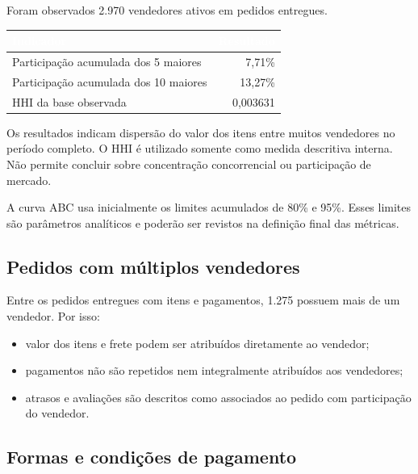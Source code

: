 \documentclass[12pt,a4paper]{article}
\newcounter{none}
\newcommand{\CabecalhoTabela}[1]{\textcolor{white}{\textbf{#1}}}
\providecommand{\tightlist}{
  \setlength{\itemsep}{0pt}\setlength{\parskip}{0pt}
}
\begin{document}
Foram observados 2.970 vendedores ativos em pedidos entregues.

{\def\LTcaptype{none} %
\begin{longtable}[]{@{}lr@{}}
\toprule\noalign{}
\rowcolor{AzulCorporativo}
\CabecalhoTabela{Indicador} & \CabecalhoTabela{Resultado} \\
\midrule\noalign{}
\endhead
\bottomrule\noalign{}
\endlastfoot
Participação acumulada dos 5 maiores & 7,71\% \\
Participação acumulada dos 10 maiores & 13,27\% \\
HHI da base observada & 0,003631 \\
\end{longtable}
}

Os resultados indicam dispersão do valor dos itens entre muitos
vendedores no período completo. O HHI é utilizado somente como medida
descritiva interna. Não permite concluir sobre concentração
concorrencial ou participação de mercado.

A curva ABC usa inicialmente os limites acumulados de 80\% e 95\%. Esses
limites são parâmetros analíticos e poderão ser revistos na definição
final das métricas.

\subsection{Pedidos com múltiplos
vendedores}\label{docs__analytics__evidencias_consultas_analiticas_core.md__pedidos-com-muxfaltiplos-vendedores}

Entre os pedidos entregues com itens e pagamentos, 1.275 possuem mais de
um vendedor. Por isso:

\begin{itemize}
\tightlist
\item
  valor dos itens e frete podem ser atribuídos diretamente ao vendedor;
\item
  pagamentos não são repetidos nem integralmente atribuídos aos
  vendedores;
\item
  atrasos e avaliações são descritos como associados ao pedido com
  participação do vendedor.
\end{itemize}

\subsection{Formas e condições de
pagamento}\label{docs__analytics__evidencias_consultas_analiticas_core.md__formas-e-condiuxe7uxf5es-de-pagamento}
\end{document}
